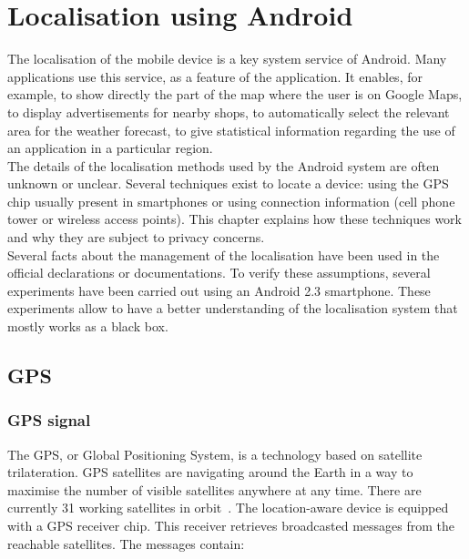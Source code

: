 \chapter{Localisation using Android}
\label{chap:and-loc}

The localisation of the mobile device is a key system service of Android.
Many applications use this service, as a feature of the application.
It enables, for example, to show directly the part of the map where the user is on Google Maps, to display advertisements for nearby shops, to automatically select the relevant area for the weather forecast, to give statistical information regarding the use of an application in a particular region.\\

The details of the localisation methods used by the Android system are often unknown or unclear.
Several techniques exist to locate a device: using the GPS chip usually present in smartphones or using connection information (cell phone tower or wireless access points).
This chapter explains how these techniques work and why they are subject to privacy concerns.\\

Several facts about the management of the localisation have been used in the official declarations or documentations.
To verify these assumptions, several experiments have been carried out using an Android 2.3 smartphone.
These experiments allow to have a better understanding of the localisation system that mostly works as a black box.


\section{GPS}
\label{sec:loc-gps}


\subsection{GPS signal}

The GPS, or Global Positioning System, is a technology based on satellite trilateration.
GPS satellites are navigating around the Earth in a way to maximise the number of visible satellites anywhere at any time.
There are currently 31 working satellites in orbit~\cite{pocketgpsworld}.
The location-aware device is equipped with a GPS receiver chip.
This receiver retrieves broadcasted messages from the reachable satellites.
The messages contain:

